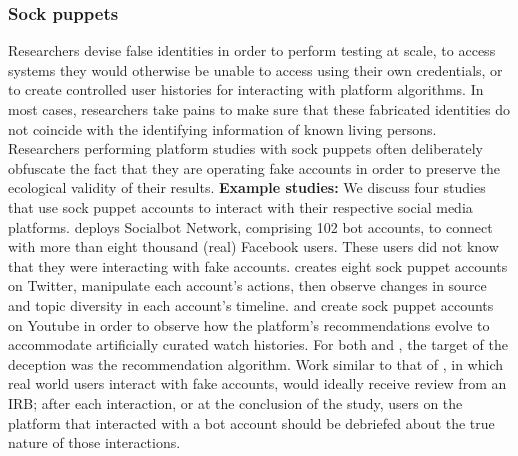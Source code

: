 \subsubsection{Sock puppets}
\label{sec:sock_puppets}
Researchers devise false identities in order to perform testing at scale, to access systems they would otherwise be unable to access using their own credentials, or to create controlled user histories for interacting with platform algorithms. In most cases, researchers take pains to make sure that these fabricated identities do not coincide with the identifying information of known living persons. Researchers performing platform studies with sock puppets often deliberately obfuscate the fact that they are operating fake accounts in order to preserve the ecological validity of their results. \textbf{Example studies:} We discuss four studies that use sock puppet accounts to interact with their respective social media platforms. \cite{boshmaf2011socialbot}
deploys Socialbot Network, comprising 102 bot accounts, to connect with more than eight thousand (real) Facebook users. These users did not know that they were interacting with fake accounts. \cite{bandy2021more} creates eight sock puppet accounts on Twitter, manipulate each account's actions, then observe changes in source and topic diversity in each account's timeline. \cite{srba2023auditing} and \cite{hosseinmardi2024causally} create sock puppet accounts on Youtube in order to observe how the platform's recommendations evolve to accommodate artificially curated watch histories. For both \cite{bandy2021more} and \cite{srba2023auditing}, the target of the deception was the recommendation algorithm. Work similar to that of \cite{boshmaf2011socialbot}, in which real world users interact with fake accounts, would ideally receive review from an IRB; after each interaction, or at the conclusion of the study, users on the platform that interacted with a bot account should be debriefed about the true nature of those interactions.  

